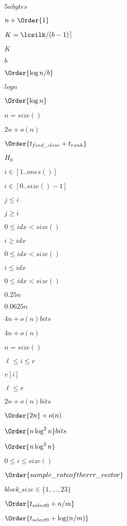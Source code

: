 \documentclass{article}
\begin{document}
$5n bytes$
\pagebreak

$ n+\Order{1} $
\pagebreak

$K=\lceilk/(b-1)\rceil$
\pagebreak

$K$
\pagebreak

$ b $
\pagebreak

$\Order{\log n/b}$
\pagebreak

$ log n $
\pagebreak

$\Order{\log n}$
\pagebreak

$n=size()$
\pagebreak

$ 2n+o(n) $
\pagebreak

$ \Order{t_{find\_close} + t_{rank}} $
\pagebreak

$H_0$
\pagebreak

$i\in [1..ones()]$
\pagebreak

$ i \in [0..size()-1] $
\pagebreak

$j \leq i$
\pagebreak

$ j \geq i $
\pagebreak

$ 0 \leq idx < size() $
\pagebreak

$i\geq idx$
\pagebreak

$ 0\leq idx < size()$
\pagebreak

$i \leq idx$
\pagebreak

$ 0 \leq idx < size()$
\pagebreak

$ 0.25n$
\pagebreak

$ 0.0625n$
\pagebreak

$4 n+o(n) bits$
\pagebreak

$ 4n+o(n) $
\pagebreak

$ n=size() $
\pagebreak

$\ell \leq i \leq r$
\pagebreak

$ v[i] $
\pagebreak

$ \ell \leq r $
\pagebreak

$2 n+o(n) bits$
\pagebreak

$ \Order{2n}+o(n) $
\pagebreak

$\Order{n\log^2 n} bits$
\pagebreak

$ \Order{n\log^2 n} $
\pagebreak

$0\leq i \leq size()$
\pagebreak

$ \Order{ sample\_rate of the rrr\_vector} $
\pagebreak

$ block\_size \in \{1,...,23\} $
\pagebreak

$ \Order{t_{select0} + n/m} $
\pagebreak

$\Order{t_{select0}+\log(n/m)}$
\pagebreak
\end{document}
